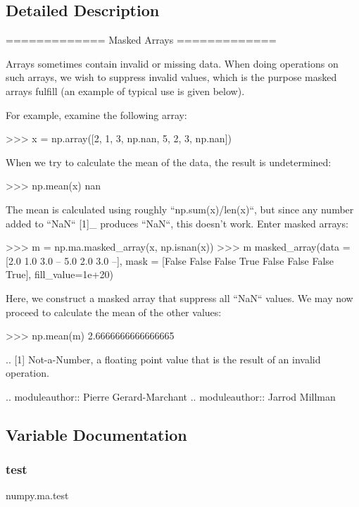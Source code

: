 \subsection{Detailed Description}
\begin{DoxyVerb}=============
Masked Arrays
=============

Arrays sometimes contain invalid or missing data.  When doing operations
on such arrays, we wish to suppress invalid values, which is the purpose masked
arrays fulfill (an example of typical use is given below).

For example, examine the following array:

>>> x = np.array([2, 1, 3, np.nan, 5, 2, 3, np.nan])

When we try to calculate the mean of the data, the result is undetermined:

>>> np.mean(x)
nan

The mean is calculated using roughly ``np.sum(x)/len(x)``, but since
any number added to ``NaN`` [1]_ produces ``NaN``, this doesn't work.  Enter
masked arrays:

>>> m = np.ma.masked_array(x, np.isnan(x))
>>> m
masked_array(data = [2.0 1.0 3.0 -- 5.0 2.0 3.0 --],
      mask = [False False False  True False False False  True],
      fill_value=1e+20)

Here, we construct a masked array that suppress all ``NaN`` values.  We
may now proceed to calculate the mean of the other values:

>>> np.mean(m)
2.6666666666666665

.. [1] Not-a-Number, a floating point value that is the result of an
       invalid operation.

.. moduleauthor:: Pierre Gerard-Marchant
.. moduleauthor:: Jarrod Millman\end{DoxyVerb}
 

\subsection{Variable Documentation}
\mbox{\label{namespacenumpy_1_1ma_a69031d1783dd0a4d2ce67e6c000ac1ee}} 
\subsubsection{\texorpdfstring{test}{test}}
{\footnotesize\ttfamily numpy.\+ma.\+test}

